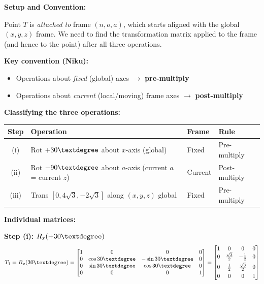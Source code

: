 \documentclass[12pt,a3paper]{article}
\begin{document}
\begin{enumerate}
\begin{tcolorbox}[enhanced,breakable,ansbox,colback=cD!4,colframe=cD,
  boxrule=0.8pt,arc=5pt,
  title={\textbf{Answer}},fonttitle=\bfseries\color{white},colbacktitle=cD]

\textbf{Setup and Convention:}

Point $T$ is \emph{attached to} frame $(n,o,a)$, which starts aligned
with the global $(x,y,z)$ frame. We need to find the transformation
matrix applied to the frame (and hence to the point) after all three
operations.

\textbf{Key convention (Niku):}
\begin{itemize}[leftmargin=1.5em,itemsep=2pt]
  \item Operations about \emph{fixed} (global) axes $\to$
    \textbf{pre-multiply}
  \item Operations about \emph{current} (local/moving) frame axes $\to$
    \textbf{post-multiply}
\end{itemize}

\textbf{Classifying the three operations:}

\begin{center}
\small
\begin{tabular}{@{}clll@{}}
\toprule
\textbf{Step} & \textbf{Operation} & \textbf{Frame} & \textbf{Rule}\\
\midrule
(i)  & Rot $+30\textdegree$ about $x$-axis (global) & Fixed   & Pre-multiply \\
(ii) & Rot $-90\textdegree$ about $a$-axis (current $a$ = current $z$) & Current & Post-multiply\\
(iii)& Trans $[0,4\sqrt{3},-2\sqrt{3}]$ along $(x,y,z)$ global & Fixed   & Pre-multiply\\
\bottomrule
\end{tabular}
\end{center}

\textbf{Individual matrices:}

\textbf{Step (i):} $R_x(+30\textdegree)$
\[
  T_1 = R_x(30\textdegree) =
  \begin{bmatrix}
    1 & 0           & 0          & 0 \\
    0 & \cos30\textdegree & -\sin30\textdegree & 0 \\
    0 & \sin30\textdegree &  \cos30\textdegree & 0 \\
    0 & 0           & 0          & 1
  \end{bmatrix}
  =
  \begin{bmatrix}
    1 & 0 & 0 & 0 \\
    0 & \frac{\sqrt{3}}{2} & -\frac{1}{2} & 0 \\[4pt]
    0 & \frac{1}{2} & \frac{\sqrt{3}}{2} & 0 \\[4pt]
    0 & 0 & 0 & 1
  \end{bmatrix}
\]


\end{tcolorbox}
\end{enumerate}
\end{document}
